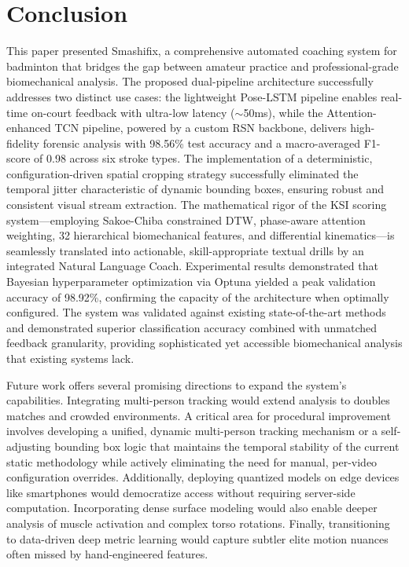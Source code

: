 \documentclass[pdflatex,sn-mathphys-num]{sn-jnl}%
\theoremstyle{thmstyleone}%
\theoremstyle{thmstyletwo}%
\theoremstyle{thmstylethree}%
\begin{document}

\section{Conclusion}\label{sec6}
This paper presented Smashifix, a comprehensive automated coaching system for badminton that bridges the gap between amateur practice and professional-grade biomechanical analysis. The proposed dual-pipeline architecture successfully addresses two distinct use cases: the lightweight Pose-LSTM pipeline enables real-time on-court feedback with ultra-low latency ($\sim$50ms), while the Attention-enhanced TCN pipeline, powered by a custom RSN backbone, delivers high-fidelity forensic analysis with 98.56\% test accuracy and a macro-averaged F1-score of 0.98 across six stroke types. The implementation of a deterministic, configuration-driven spatial cropping strategy successfully eliminated the temporal jitter characteristic of dynamic bounding boxes, ensuring robust and consistent visual stream extraction. The mathematical rigor of the KSI scoring system---employing Sakoe-Chiba constrained DTW, phase-aware attention weighting, 32 hierarchical biomechanical features, and differential kinematics---is seamlessly translated into actionable, skill-appropriate textual drills by an integrated Natural Language Coach. Experimental results demonstrated that Bayesian hyperparameter optimization via Optuna yielded a peak validation accuracy of 98.92\%, confirming the capacity of the architecture when optimally configured. The system was validated against existing state-of-the-art methods and demonstrated superior classification accuracy combined with unmatched feedback granularity, providing sophisticated yet accessible biomechanical analysis that existing systems lack.

Future work offers several promising directions to expand the system's capabilities. Integrating multi-person tracking would extend analysis to doubles matches and crowded environments. A critical area for procedural improvement involves developing a unified, dynamic multi-person tracking mechanism or a self-adjusting bounding box logic that maintains the temporal stability of the current static methodology while actively eliminating the need for manual, per-video configuration overrides. Additionally, deploying quantized models on edge devices like smartphones would democratize access without requiring server-side computation. Incorporating dense surface modeling would also enable deeper analysis of muscle activation and complex torso rotations. Finally, transitioning to data-driven deep metric learning would capture subtler elite motion nuances often missed by hand-engineered features.
\backmatter
\end{document}
